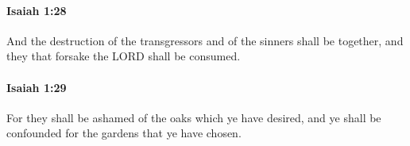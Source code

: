 		\paragraph{Isaiah 1:28} %
			\label{ISAIAH-1-28}

			And the destruction of the transgressors and of the sinners shall be together, and they that forsake the LORD shall be consumed.


		\paragraph{Isaiah 1:29} %
			\label{ISAIAH-1-29}

			For they shall be ashamed of the oaks which ye have desired, and ye shall be confounded for the gardens that ye have chosen.


